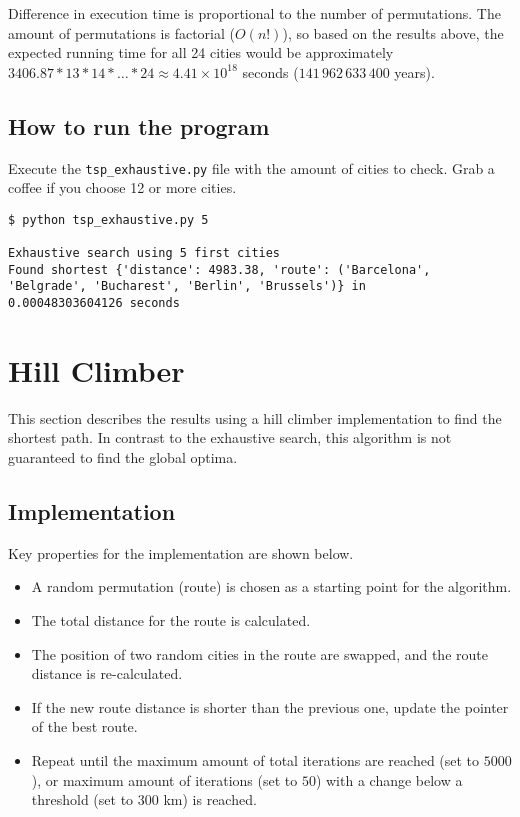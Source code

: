 \documentclass{article}
\begin{document}
\noindent Difference in execution time is proportional to the number of permutations. The amount of permutations is factorial ($O(n!)$), so based on the results above, the expected running time for all 24 cities would be approximately $3406.87 * 13 * 14 * \ldots * 24 \approx 4.41 \times 10^{18}$ seconds ($141\,962\,633\,400$ years).

\subsection*{How to run the program}

Execute the \texttt{tsp\_exhaustive.py} file with the amount of cities to check. Grab a coffee if you choose 12 or more cities.

\begin{verbatim}
$ python tsp_exhaustive.py 5

Exhaustive search using 5 first cities
Found shortest {'distance': 4983.38, 'route': ('Barcelona',
'Belgrade', 'Bucharest', 'Berlin', 'Brussels')} in
0.00048303604126 seconds
\end{verbatim}

\section*{Hill Climber}

This section describes the results using a hill climber implementation to find the shortest path. In contrast to the exhaustive search, this algorithm is not guaranteed to find the global optima.

\subsection*{Implementation}

Key properties for the implementation are shown below.

\begin{itemize}
    \item A random permutation (route) is chosen as a starting point for the algorithm.
    \item The total distance for the route is calculated.
    \item The position of two random cities in the route are swapped, and the route distance is re-calculated.
    \item If the new route distance is shorter than the previous one, update the pointer of the best route.
    \item Repeat until the maximum amount of total iterations are reached (set to $5000$), or maximum amount of iterations (set to $50$) with a change below a threshold (set to $300$ km) is reached.
\end{itemize}
\end{document}
